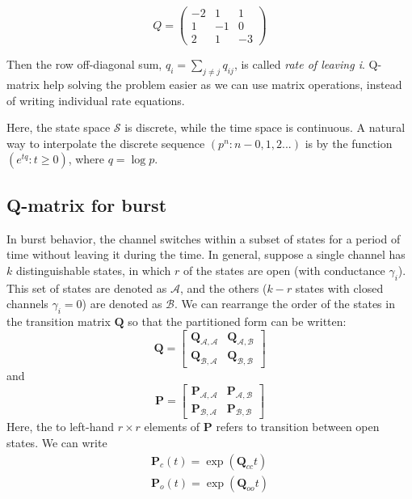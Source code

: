 \begin{equation}
  \label{eq:178}
  Q = \left(
    \begin{array}{ccc}
      -2 & 1 & 1 \\
      1 & -1 & 0 \\
      2 & 1 & -3
    \end{array}
\right)
\end{equation}

Then the row off-diagonal sum, $q_i=\sum_{j\ne j} q_{ij}$, is called
{\it rate of leaving i}. Q-matrix help solving the problem easier as
we can use matrix operations, instead of writing individual rate
equations.


Here, the state space $\mathcal{S}$ is discrete, while the time space
is continuous. A natural way to interpolate the discrete sequence
$(p^n:n-0,1,2...)$ is by the function $(e^{tq}:t\ge 0)$, where $q=\log
p$.


\subsection{Q-matrix for burst}

In burst behavior, the channel switches within a subset of states for a period
of time without leaving it during the time.  In general, suppose a single
channel has $k$ distinguishable states, in which $r$ of the states are open
(with conductance $\gamma_i$). This set of states are denoted as $\mathcal{A}$,
and the others ($k-r$ states with closed channels $\gamma_i=0$) are denoted as
$\mathcal{B}$. We can rearrange the order of the states in the transition matrix
$\mathbf{Q}$ so that the partitioned form can be written:
\begin{equation}
  \label{eq:573}
  \mathbf{Q} = \left[    \begin{array}{cc}
      \mathbf{Q}_{\mathcal{A,A}} &  \mathbf{Q}_{\mathcal{A,B}} \\
      \mathbf{Q}_{\mathcal{B,A}} &  \mathbf{Q}_{\mathcal{B,B}}
    \end{array}
    \right]
\end{equation}
and
\begin{equation}
\label{eq:1468}
  \mathbf{P} = \left[    \begin{array}{cc}
      \mathbf{P}_{\mathcal{A,A}} &  \mathbf{P}_{\mathcal{A,B}} \\
      \mathbf{P}_{\mathcal{B,A}} &  \mathbf{P}_{\mathcal{B,B}}
    \end{array}
    \right]
\end{equation}
Here, the to left-hand $r\times r$ elements of $\mathbf{P}$ refers to transition
between open states.
We can write
\begin{equation}
\begin{split}
\mathbf{P}_c(t) = \exp(\mathbf{Q}_{cc}t)\\
\mathbf{P}_o(t) = \exp(\mathbf{Q}_{oo}t)
\end{split}
\end{equation}


